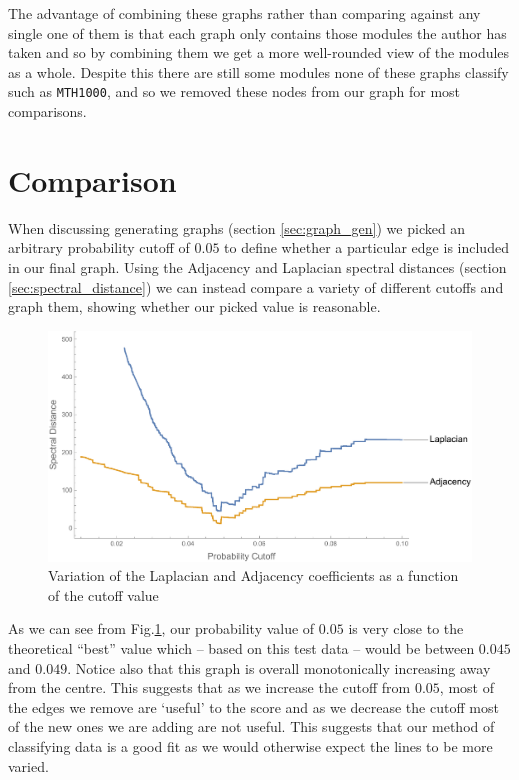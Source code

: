 \documentclass[english, 12pt]{article}
\begin{document}
The advantage of combining these graphs rather than comparing against any single one of them is that each graph only contains those modules the author has taken and so by combining them we get a more well-rounded view of the modules as a whole. Despite this there are still some modules none of these graphs classify such as \texttt{MTH1000}, and so we removed these nodes from our graph for most comparisons.

\section{Comparison}
When discussing generating graphs (section \ref{sec:graph_gen}) we picked an arbitrary probability cutoff of $0.05$ to define whether a particular edge is included in our final graph. Using the Adjacency and Laplacian spectral distances (section \ref{sec:spectral_distance}) we can instead compare a variety of different cutoffs and graph them, showing whether our picked value is reasonable.
\begin{figure}[h!]
\centering
\includegraphics[scale=0.6]{CutoffComparison.pdf}
\caption{Variation of the Laplacian and Adjacency coefficients as a function of the cutoff value}
\label{fig:cutoff_comp}
\end{figure}

As we can see from Fig.\ref{fig:cutoff_comp}, our probability value of $0.05$ is very close to the theoretical ``best'' value which -- based on this test data -- would be between $0.045$ and $0.049$. Notice also that this graph is overall monotonically increasing away from the centre. This suggests that as we increase the cutoff from $0.05$, most of the edges we remove are `useful' to the score and as we decrease the cutoff most of the new ones we are adding are not useful. This suggests that our method of classifying data is a good fit as we would otherwise expect the lines to be more varied.
\end{document}
